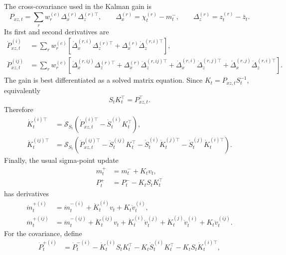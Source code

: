 The cross-covariance used in the Kalman gain is
\begin{equation}
\label{eq:bf-svd-sp-cross-cov}
  P_{xz,t}
  =
  \sum_r w_r^{(c)}
  \Delta_x^{(r)}\Delta_z^{(r)\top},
  \qquad
  \Delta_x^{(r)}=\chi_t^{(r)}-m_t^-,
  \qquad
  \Delta_z^{(r)}=z_t^{(r)}-\bar z_t .
\end{equation}
Its first and second derivatives are
\begin{align}
\label{eq:bf-svd-sp-cross-first}
  \dot P_{xz,t}^{(i)}
  &=
  \sum_r w_r^{(c)}
  \left[
    \dot\Delta_x^{(r,i)}\Delta_z^{(r)\top}
    +\Delta_x^{(r)}\dot\Delta_z^{(r,i)\top}
  \right],\\
\label{eq:bf-svd-sp-cross-second}
  \ddot P_{xz,t}^{(ij)}
  &=
  \sum_r w_r^{(c)}
  \left[
    \ddot\Delta_x^{(r,ij)}\Delta_z^{(r)\top}
    +\Delta_x^{(r)}\ddot\Delta_z^{(r,ij)\top}
    +\dot\Delta_x^{(r,i)}\dot\Delta_z^{(r,j)\top}
    +\dot\Delta_x^{(r,j)}\dot\Delta_z^{(r,i)\top}
  \right].
\end{align}
The gain is best differentiated as a solved matrix equation.  Since
$K_t=P_{xz,t}S_t^{-1}$, equivalently
\[
  S_tK_t^\top=P_{xz,t}^\top.
\]
Therefore
\begin{align}
\label{eq:bf-svd-sp-gain-first}
  \dot K_t^{(i)\top}
  &=
  \mathcal{S}_{S_t}
  \left(\dot P_{xz,t}^{(i)\top}-\dot S_t^{(i)}K_t^\top\right),\\
\label{eq:bf-svd-sp-gain-second}
  \ddot K_t^{(ij)\top}
  &=
  \mathcal{S}_{S_t}
  \left(
    \ddot P_{xz,t}^{(ij)\top}
    -\ddot S_t^{(ij)}K_t^\top
    -\dot S_t^{(i)}\dot K_t^{(j)\top}
    -\dot S_t^{(j)}\dot K_t^{(i)\top}
  \right).
\end{align}
Finally, the usual sigma-point update
\begin{align}
\label{eq:bf-svd-sp-filtered-update}
  m_t^+ &= m_t^-+K_tv_t,\\
  P_t^+ &= P_t^- - K_tS_tK_t^\top
\end{align}
has derivatives
\begin{align}
\label{eq:bf-svd-sp-filtered-mean-first}
  \dot m_t^{+(i)}
  &=
  \dot m_t^{-(i)}
  +\dot K_t^{(i)}v_t
  +K_t\dot v_t^{(i)},\\
\label{eq:bf-svd-sp-filtered-mean-second}
  \ddot m_t^{+(ij)}
  &=
  \ddot m_t^{-(ij)}
  +\ddot K_t^{(ij)}v_t
  +\dot K_t^{(i)}\dot v_t^{(j)}
  +\dot K_t^{(j)}\dot v_t^{(i)}
  +K_t\ddot v_t^{(ij)}.
\end{align}
For the covariance, define
\begin{align}
\label{eq:bf-svd-sp-filtered-cov-first}
  \dot P_t^{+(i)}
  &=
  \dot P_t^{-(i)}
  -\dot K_t^{(i)}S_tK_t^\top
  -K_t\dot S_t^{(i)}K_t^\top
  -K_tS_t\dot K_t^{(i)\top},
\end{align}
